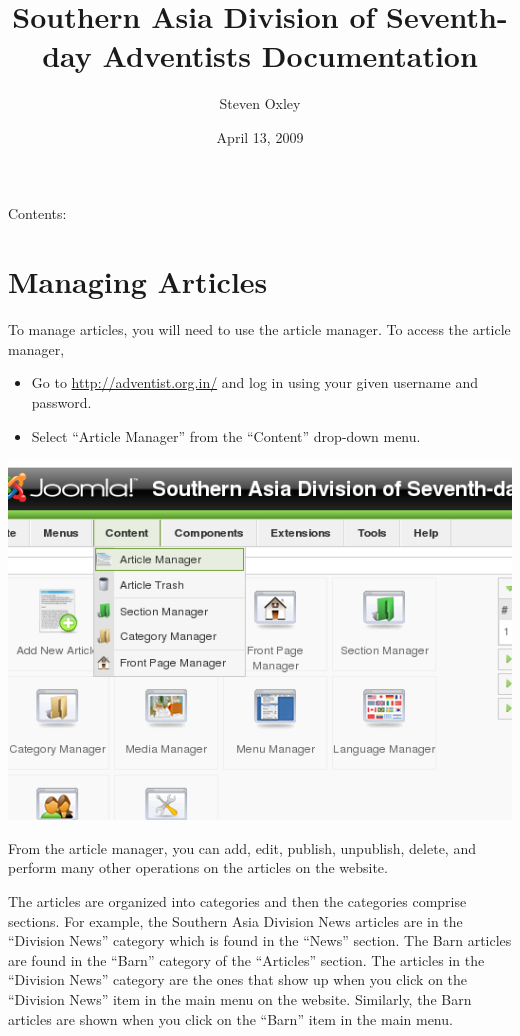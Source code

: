 \documentclass[letterpaper,10pt,english]{manual}
\title{Southern Asia Division of Seventh-day Adventists Documentation}
\date{April 13, 2009}
\author{Steven Oxley}
\begin{document}
\maketitle
\tableofcontents



Contents:

\resetcurrentobjects
\hypertarget{--doc-managingArticles}{}

\hypertarget{index-49}{}\chapter{Managing Articles}

To manage articles, you will need to use the article manager.  To access the article manager,
\begin{itemize}
\item {} 
Go to \href{http://adventist.org.in/}{http://adventist.org.in/} and log in using your given username and password.

\item {} 
Select “Article Manager” from the “Content” drop-down menu.

\end{itemize}

{\hfill\includegraphics{articleManagerLink1.png}\hfill}

From the article manager, you can add, edit, publish, unpublish, delete, and perform many other operations on the articles on the website.

The articles are organized into categories and then the categories comprise sections.  For example, the Southern Asia Division News articles are in the “Division News” category which is found in the “News” section.  The Barn articles are found in the “Barn” category of the “Articles” section.  The articles in the “Division News” category are the ones that show up when you click on the “Division News” item in the main menu on the website.  Similarly, the Barn articles are shown when you click on the “Barn” item in the main menu.
\end{document}
